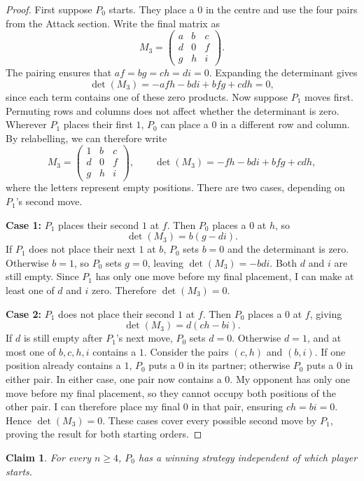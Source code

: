 \documentclass[11pt]{article}
\newtheorem{claim}{Claim}
\begin{document}
\begin{proof}
First suppose $P_0$ starts. They place a $0$ in the centre and use the four pairs from the Attack section. Write the final matrix as
$$ M_3=\begin{pmatrix}a&b&c\\d&0&f\\g&h&i\end{pmatrix}.$$
The pairing ensures that $af=bg=ch=di=0$. Expanding the determinant gives
$$ \det(M_3)=-afh-bdi+bfg+cdh=0, $$
since each term contains one of these zero products.
Now suppose $P_1$ moves first. Permuting rows and columns does not affect whether the determinant is zero. Wherever $P_1$ places their first $1$, $P_0$ can place a $0$ in a different row and column. By relabelling, we can therefore write
$$
M_3=\begin{pmatrix}1&b&c\\d&0&f\\g&h&i\end{pmatrix},
\qquad
\det(M_3)=-fh-bdi+bfg+cdh,
$$
where the letters represent empty positions. There are two cases, depending on $P_1$'s second move.

\textbf{Case 1:} $P_1$ places their second $1$ at $f$. Then $P_0$ places a $0$ at $h$, so
$$
\det(M_3)=b(g-di).
$$
If $P_1$ does not place their next $1$ at $b$, $P_0$ sets $b=0$ and the determinant is zero. Otherwise $b=1$, so $P_0$ sets $g=0$, leaving $\det(M_3)=-bdi$. Both $d$ and $i$ are still empty. Since $P_1$ has only one move before my final placement, I can make at least one of $d$ and $i$ zero. Therefore $\det(M_3)=0$.

\textbf{Case 2:} $P_1$ does not place their second $1$ at $f$. Then $P_0$ places a $0$ at $f$, giving
$$
\det(M_3)=d(ch-bi).
$$
If $d$ is still empty after $P_1$'s next move, $P_0$ sets $d=0$. Otherwise $d=1$, and at most one of $b,c,h,i$ contains a $1$. Consider the pairs $(c,h)$ and $(b,i)$. If one position already contains a $1$, $P_0$ puts a $0$ in its partner; otherwise $P_0$ puts a $0$ in either pair. In either case, one pair now contains a $0$. My opponent has only one move before my final placement, so they cannot occupy both positions of the other pair. I can therefore place my final $0$ in that pair, ensuring $ch=bi=0$. Hence $\det(M_3)=0$.
These cases cover every possible second move by $P_1$, proving the result for both starting orders.
\end{proof}

\medskip
\begin{claim}
For every $n\geq4$, $P_0$ has a winning strategy independent of which player starts.
\end{claim}
\end{document}
